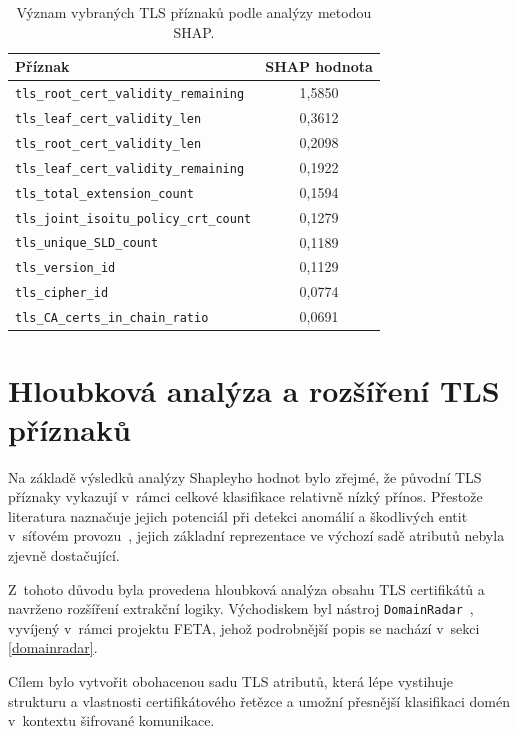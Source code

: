 \begin{table}[H]
\centering

\begin{tabular}{|l|c|}
\hline
\textbf{Příznak} & \textbf{SHAP hodnota} \\
\hline
\texttt{tls\_root\_cert\_validity\_remaining} & 1{,}5850 \\
\texttt{tls\_leaf\_cert\_validity\_len}       & 0{,}3612 \\
\texttt{tls\_root\_cert\_validity\_len}       & 0{,}2098 \\
\texttt{tls\_leaf\_cert\_validity\_remaining} & 0{,}1922 \\
\texttt{tls\_total\_extension\_count}         & 0{,}1594 \\
\texttt{tls\_joint\_isoitu\_policy\_crt\_count} & 0{,}1279 \\
\texttt{tls\_unique\_SLD\_count}              & 0{,}1189 \\
\texttt{tls\_version\_id}                     & 0{,}1129 \\
\texttt{tls\_cipher\_id}                      & 0{,}0774 \\
\texttt{tls\_CA\_certs\_in\_chain\_ratio}      & 0{,}0691 \\
\hline
\end{tabular}
\caption{Význam vybraných TLS příznaků podle analýzy metodou SHAP.}
\label{tab:tls_shap_values}
\end{table}

\section*{Hloubková analýza a rozšíření TLS příznaků}

Na základě výsledků analýzy Shapleyho hodnot bylo zřejmé, že původní TLS příznaky vykazují v~rámci celkové klasifikace relativně nízký přínos. Přestože literatura naznačuje jejich potenciál při detekci anomálií a škodlivých entit v~síťovém provozu~\cite{torroledo2018hunting}, jejich základní reprezentace ve výchozí sadě atributů nebyla zjevně dostačující.

Z~tohoto důvodu byla provedena hloubková analýza obsahu TLS certifikátů a navrženo rozšíření extrakční logiky. Východiskem byl nástroj \texttt{DomainRadar}~\cite{domainradar}, vyvíjený v~rámci projektu FETA, jehož podrobnější popis se nachází v~sekci \ref{domainradar}.

Cílem bylo vytvořit obohacenou sadu TLS atributů, která lépe vystihuje strukturu a vlastnosti certifikátového řetězce a umožní přesnější klasifikaci domén v~kontextu šifrované komunikace.

